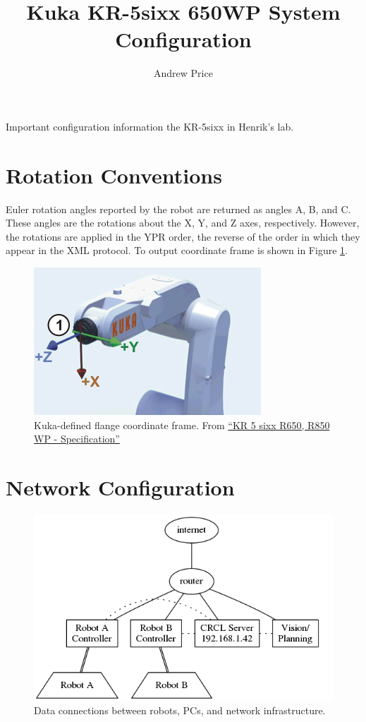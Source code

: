 \documentclass[12pt,letterpaper]{article}
\author{Andrew Price}
\title{Kuka KR-5sixx 650WP System Configuration}
\begin{document}
\maketitle

Important configuration information the KR-5sixx in Henrik’s lab.

\section{Rotation Conventions}

Euler rotation angles reported by the robot are returned as angles A, B, and C. These angles are the rotations about the X, Y, and Z axes, respectively. However, the rotations are applied in the YPR order, the reverse of the order in which they appear in the XML protocol. To output coordinate frame is shown in Figure \ref{fig:flangeFrame}.
\begin{figure}[h!]
\centering
\includegraphics[scale=0.45]{tool_frame.png}
\caption{Kuka-defined flange coordinate frame. From \href{run:kr_5_sixx_wp_en.pdf}{``KR 5 sixx R650, R850 WP - Specification''}}
\label{fig:flangeFrame}
\end{figure}

\newpage
\section{Network Configuration}
\begin{figure}[h!]
\centering
\includegraphics[scale=0.45]{network.png}
\caption{Data connections between robots, PCs, and network infrastructure.}
\label{fig:network}
\end{figure}
\end{document}
